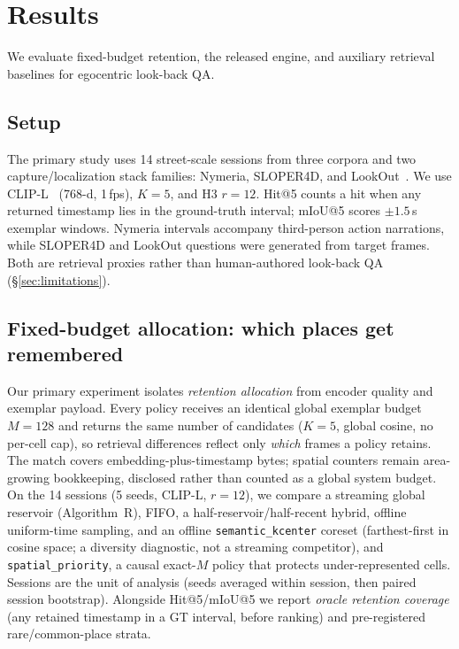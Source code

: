 
\section{Results}
\label{sec:results}

We evaluate fixed-budget retention, the released \psm{} engine, and auxiliary
retrieval baselines for egocentric look-back QA.

\subsection{Setup}
\label{sec:results-setup}

The primary study uses 14 street-scale sessions from three corpora and two
capture/localization stack families: Nymeria, SLOPER4D, and
LookOut~\cite{ma2024nymeria,dai2023sloper4d,pan2025lookout}. We use
CLIP-L~\cite{clip-l-laion,radford2021clip} (768-d, 1\,fps), $K{=}5$, and H3
$r{=}12$. Hit@5 counts a hit when any returned timestamp lies in the ground-truth
interval; mIoU@5 scores $\pm1.5$\,s exemplar windows. Nymeria intervals accompany
third-person action narrations, while SLOPER4D and LookOut questions were
generated from target frames. Both are retrieval proxies rather than
human-authored look-back QA (\S\ref{sec:limitations}).

\subsection{Fixed-budget allocation: which places get remembered}
\label{sec:results-main}

Our primary experiment isolates \emph{retention allocation} from encoder quality
and exemplar payload. Every policy receives an identical global exemplar budget
$M{=}128$ and returns the same number of candidates ($K{=}5$, global cosine, no
per-cell cap), so retrieval differences reflect only \emph{which} frames a policy
retains. The match covers embedding-plus-timestamp bytes; spatial counters remain
area-growing bookkeeping, disclosed rather than counted as a global system budget.
On the 14 sessions (5 seeds, CLIP-L, $r{=}12$), we compare a streaming
global reservoir (Algorithm~R), FIFO, a half-reservoir/half-recent hybrid,
offline uniform-time sampling, and an offline
\texttt{semantic\_kcenter} coreset (farthest-first in cosine space; a
diversity diagnostic, not a streaming competitor), and \texttt{spatial\_priority},
a causal exact-$M$ policy that protects under-represented cells. Sessions are the
unit of analysis (seeds averaged within session, then paired session bootstrap).
Alongside Hit@5/mIoU@5 we report \emph{oracle retention coverage} (any retained
timestamp in a GT interval, before ranking) and pre-registered rare/common-place
strata.


